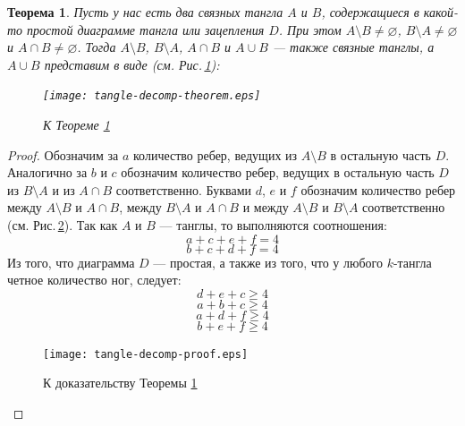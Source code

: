 \documentclass[12pt]{article}
\theoremstyle{plain}
\newtheorem{theorem}{Теорема}
\theoremstyle{definition}
\def\figureref#1{Рис.\,\protect\ref{#1}}
\begin{document}
		\begin{theorem}
			\label{theorem:tangle-decomp-th}
			Пусть у нас есть два связных тангла $A$ и $B$, содержащиеся в какой-то простой диаграмме
			тангла или зацепления $D$. При этом $A\setminus B\neq\varnothing$, $B\setminus A\neq\varnothing$
			и $A\cap B\neq\varnothing$. Тогда $A\setminus B$, $B\setminus A$, $A\cap B$ и $A\cup B$ --- также связные
			танглы, а $A\cup B$ представим в виде (см. \figureref{figure:tangle-decomp}):

			\begin{figure}[H]
				\centering
				\texttt{[image: tangle-decomp-theorem.eps]}
				\caption{\footnotesize К Теореме \ref{theorem:tangle-decomp-th}\label{figure:tangle-decomp}}
			\end{figure}
		\end{theorem}
		\begin{proof}
			Обозначим за $a$ количество ребер, ведущих из $A\setminus B$ в остальную часть $D$. Аналогично за $b$ и $c$
			обозначим количество ребер, ведущих в остальную часть $D$ из $B\setminus A$ и из $A\cap B$ соответственно.
			Буквами $d$, $e$ и $f$ обозначим количество ребер между $A\setminus B$ и $A\cap B$, между $B\setminus A$ и
			$A\cap B$ и между $A\setminus B$ и $B\setminus A$ соответственно (см. \figureref{figure:tangle-decomp-proof}).
			Так как $A$ и $B$ --- танглы, то выполняются соотношения:
			\begin{equation}
				\label{equation:a_relation}
				a + c + e + f = 4
			\end{equation}
			\begin{equation}
				\label{equation:b_relation}
				b + c + d + f = 4
			\end{equation}
			Из того, что диаграмма $D$ --- простая, а также из того, что у любого $k$-тангла четное количество ног, следует:
			\begin{equation}
				\label{equation:ab_relation}
				d + e + c \ge 4
			\end{equation}
			\begin{equation}
				\label{equation:all_relation}
				a + b + c \ge 4
			\end{equation}
			\begin{equation}
				\label{equation:amb_relation}
				a + d + f \ge 4
			\end{equation}
			\begin{equation}
				\label{equation:bma_relation}
				b + e + f \ge 4
			\end{equation}
			\begin{figure}[H]
				\centering
				\texttt{[image: tangle-decomp-proof.eps]}
				\caption{\footnotesize К доказательству Теоремы \ref{theorem:tangle-decomp-th}\label{figure:tangle-decomp-proof}}
			\end{figure}


\end{proof}
\end{document}
